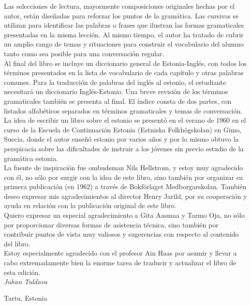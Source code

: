 Las selecciones de lectura, mayormente composiciones originales hechas por el autor, están diseñadas para reforzar los puntos de la gramática. Las cursivas se utilizan para identificar las palabras o frases que ilustran las formas gramaticales presentadas en la misma lección. Al mismo tiempo, el autor ha tratado de cubrir un amplio rango de temas y situaciones para construir el vocabulario del alumno tanto como sea posible para una conversación regular.\\

Al final del libro se incluye un diccionario general de Estonia-Inglés, con todos los términos presentados en la lista de vocabulario de cada capítulo y otras palabras comunes. Para la traducción de palabras del inglés al estonio, el estudiante necesitará un diccionario Inglés-Estonio. Una breve revisión de los términos gramaticales también se presenta al final. El índice consta de dos partes, con listados alfabéticos separados en términos gramaticales y temas de conversación.\\

La idea de escribir un libro sobre el estonio se presentó en el verano de 1960 en el curso de la Escuela de Continuación Estonia (Estniska Folkhögskolan) en Gimo, Suecia, donde el autor enseñó estonio por varios años y por lo mismo obtuvo la perspicacia sobre las dificultades de instruir a los jóvenes sin previo estudio de la gramática estonia.\\

La fuente de inspiración fue ombudsman Nils Hellstrom, y estoy muy agradecido con él, no sólo por surgir con la idea de este libro, sino también por organizar su primera publicación (en 1962) a través de Bokförlaget Medborgarskolan. También deseo expresar mis agradecimientos al director Henry Jarild, por su cooperación y ayuda en relación con la publicación original de este libro.\\

Quiero expresar un especial agradecimiento a Gita Aasmaa y Tarmo Oja, no sólo por proporcionar diversas formas de asistencia técnica, sino también por contribuir puntos de vista muy valiosos y sugerencias con respecto al contenido del libro.\\

Estoy especialmente agradecido con el profesor Ain Haas por asumir y llevar a cabo extremadamente bien la enorme tarea de traducir y actualizar el libro de esta edición.\\

\hfill \textit{Juhan Tuldava}

\hfill Tartu, Estonia			

\vfill
